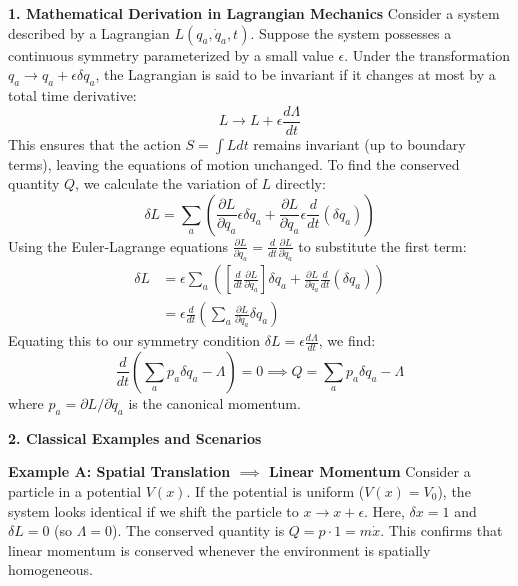 \textbf{1. Mathematical Derivation in Lagrangian Mechanics}
Consider a system described by a Lagrangian $L(q_a, \dot{q}_a, t)$. Suppose the system possesses a continuous symmetry parameterized by a small value $\epsilon$. Under the transformation $q_a \to q_a + \epsilon \delta q_a$, the Lagrangian is said to be invariant if it changes at most by a total time derivative:
\begin{equation*}
    L \to L + \epsilon \frac{d\Lambda}{dt}
\end{equation*}
This ensures that the action $S = \int L dt$ remains invariant (up to boundary terms), leaving the equations of motion unchanged. To find the conserved quantity $Q$, we calculate the variation of $L$ directly:
\begin{equation*}
    \delta L = \sum_a \left( \frac{\partial L}{\partial q_a} \epsilon \delta q_a + \frac{\partial L}{\partial \dot{q}_a} \epsilon \frac{d}{dt}(\delta q_a) \right)
\end{equation*}
Using the Euler-Lagrange equations $\frac{\partial L}{\partial q_a} = \frac{d}{dt} \frac{\partial L}{\partial \dot{q}_a}$ to substitute the first term:
\begin{align*}
    \delta L &= \epsilon \sum_a \left( \left[ \frac{d}{dt} \frac{\partial L}{\partial \dot{q}_a} \right] \delta q_a + \frac{\partial L}{\partial \dot{q}_a} \frac{d}{dt}(\delta q_a) \right) \\
    &= \epsilon \frac{d}{dt} \left( \sum_a \frac{\partial L}{\partial \dot{q}_a} \delta q_a \right)
\end{align*}
Equating this to our symmetry condition $\delta L = \epsilon \frac{d\Lambda}{dt}$, we find:
\begin{equation*}
    \frac{d}{dt} \left( \sum_a p_a \delta q_a - \Lambda \right) = 0 \implies Q = \sum_a p_a \delta q_a - \Lambda
\end{equation*}
where $p_a = \partial L / \partial \dot{q}_a$ is the canonical momentum.

\textbf{2. Classical Examples and Scenarios}

\textbf{Example A: Spatial Translation $\implies$ Linear Momentum}
Consider a particle in a potential $V(x)$. If the potential is uniform ($V(x) = V_0$), the system looks identical if we shift the particle to $x \to x + \epsilon$. Here, $\delta x = 1$ and $\delta L = 0$ (so $\Lambda = 0$).
The conserved quantity is $Q = p \cdot 1 = m\dot{x}$. This confirms that linear momentum is conserved whenever the environment is spatially homogeneous.

